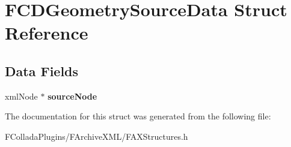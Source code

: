 \hypertarget{structFCDGeometrySourceData}{
\section{FCDGeometrySourceData Struct Reference}
\label{structFCDGeometrySourceData}
}
\subsection*{Data Fields}
\begin{DoxyCompactItemize}
\item 
\hypertarget{structFCDGeometrySourceData_a20c09f6277b3f13cc2eece3e8dd01223}{
xmlNode $\ast$ {\bfseries sourceNode}}
\label{structFCDGeometrySourceData_a20c09f6277b3f13cc2eece3e8dd01223}

\end{DoxyCompactItemize}


The documentation for this struct was generated from the following file:\begin{DoxyCompactItemize}
\item 
FColladaPlugins/FArchiveXML/FAXStructures.h\end{DoxyCompactItemize}
